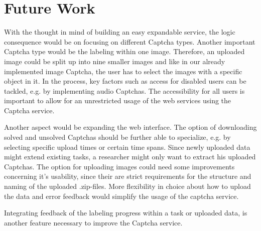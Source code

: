 \section{Future Work}
\label{sec:future_work}

With the thought in mind of building an easy expandable service, the logic consequence would be on focusing on different Captcha types. Another important Captcha type would be the labeling within one image. Therefore, an uploaded image could be split up into nine smaller images and like in our already implemented image Captcha, the user has to select the images with a specific object in it. In the process, key factors such as access for disabled users can be tackled, e.g. by implementing audio Captchas. The accessibility for all users is important to allow for an unrestricted usage of the web services using the Captcha service.

Another aspect would be expanding the web interface. The option of downloading solved and unsolved Captchas should be further able to specialize, e.g. by selecting specific upload times or certain time spans. Since newly uploaded data might extend existing tasks, a researcher might only want to extract his uploaded Captchas.
The option for uploading images could need some improvements concerning it's usability, since their are strict requirements for the structure and naming of the uploaded .zip-files. More flexibility in choice about how to upload the data and error feedback would simplify the usage of the captcha service.


Integrating feedback of the labeling progress within a task or uploaded data, is another feature necessary to improve the Captcha service.

\clearpage

